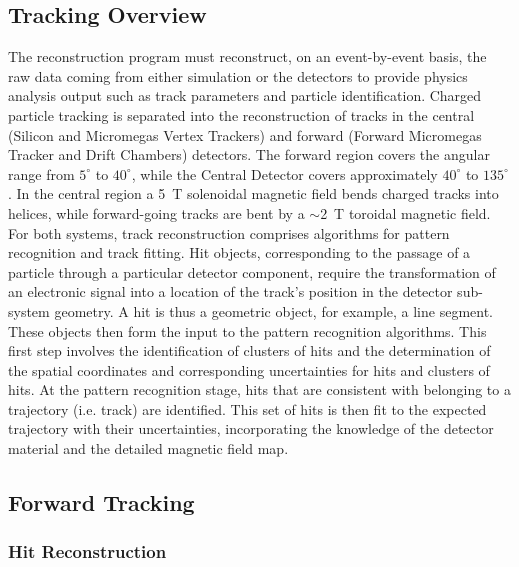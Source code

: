 \documentclass[3p,times,twocolumn]{elsarticle}
\begin{document}
\subsection{Tracking Overview}
The reconstruction program must reconstruct, on an event-by-event basis, the raw data coming from either
simulation or the detectors to provide physics analysis output such as track parameters and particle
identification. Charged particle tracking is separated into the reconstruction of tracks in the central
(Silicon and Micromegas Vertex Trackers) and forward (Forward Micromegas Tracker and Drift
Chambers) detectors. The forward region covers the angular range from $5^\circ$ to $40^\circ$, while
the Central Detector covers approximately $40^\circ$ to $135^\circ$. In the central region a 5~T
solenoidal magnetic field bends charged tracks into helices, while forward-going tracks are bent by a
$\sim$2~T toroidal magnetic field. For both systems, track reconstruction comprises algorithms for
pattern recognition and track fitting. Hit objects, corresponding to the passage of a particle through a
particular detector component, require the transformation of an electronic signal into a location of the
track's position in the detector sub-system geometry. A hit is thus a geometric object, for example, a
line segment. These objects then form the input to the pattern recognition algorithms. This first step
involves the identification of clusters of hits and the determination of the spatial coordinates and
corresponding uncertainties for hits and clusters of hits. At the pattern recognition stage, hits that are
consistent with belonging to a trajectory (i.e. track) are identified. This set of hits is then fit to the
expected trajectory with their uncertainties, incorporating the knowledge of the detector material and
the detailed magnetic field map.

\subsection{Forward Tracking}

\subsubsection{Hit Reconstruction}
\end{document}
